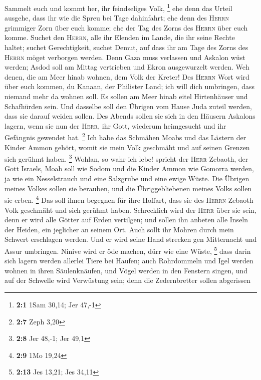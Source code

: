  Sammelt euch und kommt her, ihr feindseliges Volk,
\footnote{\textbf{2:1} 1Sam 30,14; Jer 47,-1}  ehe denn
das Urteil ausgehe, dass ihr wie die Spreu bei Tage dahinfahrt; ehe denn
des \textsc{Herrn} grimmiger Zorn über euch komme; ehe der Tag des Zorns
des \textsc{Herrn} über euch komme.  Suchet den
\textsc{Herrn}, alle ihr Elenden im Lande, die ihr seine Rechte haltet;
suchet Gerechtigkeit, suchet Demut, auf dass ihr am Tage des Zorns des
\textsc{Herrn} möget verborgen werden.  Denn Gaza muss
verlassen und Askalon wüst werden; Asdod soll am Mittag vertrieben und
Ekron ausgewurzelt werden.  Weh denen, die am Meer hinab
wohnen, dem Volk der Kreter! Des \textsc{Herrn} Wort wird über euch
kommen, du Kanaan, der Philister Land; ich will dich umbringen, dass
niemand mehr da wohnen soll.  Es sollen am Meer hinab
eitel Hirtenhäuser und Schafhürden sein.  Und dasselbe
soll den Übrigen vom Hause Juda zuteil werden, dass sie darauf weiden
sollen. Des Abends sollen sie sich in den Häusern Askalons lagern, wenn
sie nun der \textsc{Herr}, ihr Gott, wiederum heimgesucht und ihr
Gefängnis gewendet hat. \footnote{\textbf{2:7} Zeph 3,20} 
Ich habe das Schmähen Moabs und das Lästern der Kinder Ammon gehört,
womit sie mein Volk geschmäht und auf seinen Grenzen sich gerühmt haben.
\footnote{\textbf{2:8} Jer 48,-1; Jer 49,1}  Wohlan, so
wahr ich lebe! spricht der \textsc{Herr} Zebaoth, der Gott Israels, Moab
soll wie Sodom und die Kinder Ammon wie Gomorra werden, ja wie ein
Nesselstrauch und eine Salzgrube und eine ewige Wüste. Die Übrigen
meines Volkes sollen sie berauben, und die Übriggebliebenen meines Volks
sollen sie erben. \footnote{\textbf{2:9} 1Mo 19,24}  Das
soll ihnen begegnen für ihre Hoffart, dass sie des \textsc{Herrn}
Zebaoth Volk geschmäht und sich gerühmt haben. 
Schrecklich wird der \textsc{Herr} über sie sein, denn er wird alle
Götter auf Erden vertilgen; und sollen ihn anbeten alle Inseln der
Heiden, ein jeglicher an seinem Ort.  Auch sollt ihr
Mohren durch mein Schwert erschlagen werden.  Und er wird
seine Hand strecken gen Mitternacht und Assur umbringen. Ninive wird er
öde machen, dürr wie eine Wüste, \footnote{\textbf{2:13} Jes 13,21; Jes
  34,11}  dass darin sich lagern werden allerlei Tiere
bei Haufen; auch Rohrdommeln und Igel werden wohnen in ihren
Säulenknäufen, und Vögel werden in den Fenstern singen, und auf der
Schwelle wird Verwüstung sein; denn die Zedernbretter sollen abgerissen
